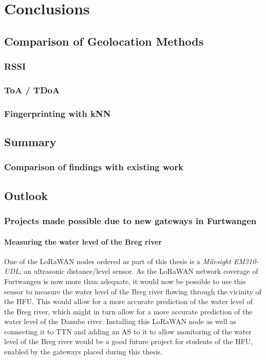 \chapter{Conclusions}

\section{Comparison of Geolocation Methods}

\subsection{\ac{RSSI}}

\subsection{\ac{ToA} / \ac{TDoA}}

\subsection{Fingerprinting with \ac{kNN}}

\section{Summary}

\subsection{Comparison of findings with existing work}


\section{Outlook}

\subsection{Projects made possible due to new gateways in Furtwangen}

\subsubsection{Measuring the water level of the Breg river}

One of the \ac{LoRaWAN} nodes ordered as part of this thesis is a \emph{Milesight EM310-UDL}, an ultrasonic distance/level sensor.
As the \ac{LoRaWAN} network coverage of Furtwangen is now more than adequate, it would now be possible to use this sensor to measure the water level of the Breg river flowing through the vicinity of the \ac{HFU}.
This would allow for a more accurate prediction of the water level of the Breg river, which might in turn allow for a more accurate prediction of the water level of the Danube river.
Installing this \ac{LoRaWAN} node as well as connecting it to \ac{TTN} and adding an \acf{AS} to it to allow monitoring of the water level of the Breg river would be a good future project for students of the \ac{HFU}, enabled by the gateways placed during this thesis.

